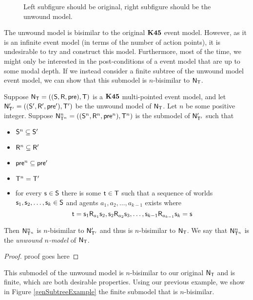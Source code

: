 \begin{figure}[ht!]
\centering
\caption{\FIXME Left subfigure should be original, right subfigure should be the
unwound model.} \label{generatedTreeExample}
\end{figure}

The unwound model is bisimilar to the original $\bf K45$ event model.
However, as it is an infinite event model (in terms of the number of action
points), it is undesirable to try and construct this model.
Furthermore, most of the time, we might only be interested in the
post-conditions of a event model that are up to some modal depth.
If we instead consider a finite subtree of the unwound model event
model, we can show that this submodel is $n$-bisimilar to $\mathrm{\mathsf{N}}_\mathrm{\mathsf{T}}$.

\begin{lemma} \label{unwoundNModel}
  Suppose $\mathrm{\mathsf{N}}_\mathrm{\mathsf{T}} = ((\mathrm{\mathsf{S}},\mathrm{\mathsf{R}},\mathrm{\mathsf{pre}}),\mathrm{\mathsf{T}})$ is a $\bf K45$ multi-pointed
  event model, and let $\mathrm{\mathsf{N}}'_{\mathrm{\mathsf{T}}'} = ((\mathrm{\mathsf{S}}', \mathrm{\mathsf{R}}', \mathrm{\mathsf{pre}}'),\mathrm{\mathsf{T}}')$ be the unwound model of $\mathrm{\mathsf{N}}_\mathrm{\mathsf{T}}$.
  Let $n$ be some positive integer.
	Suppose $\mathrm{\mathsf{N}}^n_{\mathrm{\mathsf{T}}^n} = ((\mathrm{\mathsf{S}}^n,\mathrm{\mathsf{R}}^n,\mathrm{\mathsf{pre}}^n),\mathrm{\mathsf{T}}^n)$ is the submodel of $\mathrm{\mathsf{N}}'_{\mathrm{\mathsf{T}}'}$ such that
  \begin{itemize}
    \item $\mathrm{\mathsf{S}}^n \subseteq \mathrm{\mathsf{S}}'$
    \item $\mathrm{\mathsf{R}}^n \subseteq \mathrm{\mathsf{R}}'$
    \item $\mathrm{\mathsf{pre}}^n \subseteq \mathrm{\mathsf{pre}}'$
    \item $\mathrm{\mathsf{T}}^n = \mathrm{\mathsf{T}}'$
    \item for every $\mathrm{\mathsf{s}} \in \mathrm{\mathsf{S}}$ there is some $\mathrm{\mathsf{t}} \in \mathrm{\mathsf{T}}$ such that a
    sequence of worlds $\mathrm{\mathsf{s}}_1, \mathrm{\mathsf{s}}_2, \ldots, \mathrm{\mathsf{s}}_k \in \mathrm{\mathsf{S}}$ and agents
    $a_1,a_2, \ldots, a_{k-1}$ exists where
    \[
      \mathrm{\mathsf{t}} = \mathrm{\mathsf{s}}_1 \mathrm{\mathsf{R}}_{a_1} \mathrm{\mathsf{s}}_2, \mathrm{\mathsf{s}}_2 \mathrm{\mathsf{R}}_{a_2} \mathrm{\mathsf{s}}_3, \ldots,
      \mathrm{\mathsf{s}}_{k-1} \mathrm{\mathsf{R}}_{a_{k-1}} \mathrm{\mathsf{s}}_k = \mathrm{\mathsf{s}}
    \]
  \end{itemize}
  Then $\mathrm{\mathsf{N}}^n_{\mathrm{\mathsf{T}}^n}$ is $n$-bisimilar to $\mathrm{\mathsf{N}}'_{\mathrm{\mathsf{T}}'}$ and thus is
  $n$-bisimilar to $\mathrm{\mathsf{N}}_\mathrm{\mathsf{T}}$.
  We say that $\mathrm{\mathsf{N}}^n_{\mathrm{\mathsf{T}}^n}$ is the {\em unwound $n$-model} of $\mathrm{\mathsf{N}}_\mathrm{\mathsf{T}}$.
\end{lemma}
\begin{proof}
\FIXME proof goes here
\end{proof}

This submodel of the unwound model is $n$-bisimilar to our original $\mathrm{\mathsf{N}}_\mathrm{\mathsf{T}}$
and is finite, which are both desirable properties.
Using our previous example, we show in Figure \ref{genSubtreeExample} the
finite submodel that is $n$-bisimilar.


